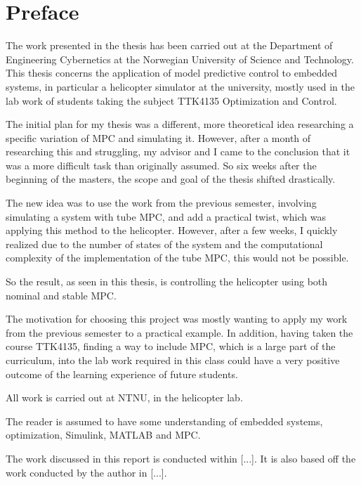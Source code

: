 \clearpage
				
\setcounter{page}{1}

\chapter*{Preface}

The work presented in the thesis has been carried out at the Department of Engineering Cybernetics at the Norwegian University of Science and Technology. This thesis concerns the application of model predictive control to embedded systems, in particular a helicopter simulator at the university, mostly used in the lab work of students taking the subject TTK4135 Optimization and Control.

The initial plan for my thesis was a different, more theoretical idea researching a specific variation of MPC and simulating it. However, after a month of researching this and struggling, my advisor and I came to the conclusion that it was a more difficult task than originally assumed. So six weeks after the beginning of the masters, the scope and goal of the thesis shifted drastically. 

The new idea was to use the work from the previous semester, involving simulating a system with tube MPC, and add a practical twist, which was applying this method to the helicopter. However, after a few weeks, I quickly realized due to the number of states of the system and the computational complexity of the implementation of the tube MPC, this would not be possible. 

So the result, as seen in this thesis, is controlling the helicopter using both nominal and stable MPC.

The motivation for choosing this project was mostly wanting to apply my work from the previous semester to a practical example. In addition, having taken the course TTK4135, finding a way to include MPC, which is a large part of the curriculum, into the lab work required in this class could have a very positive outcome of the learning experience of future students.

All work is carried out at NTNU, in the helicopter lab.

The reader is assumed  to have some understanding of embedded systems, optimization, Simulink, MATLAB and MPC.

The work discussed in this report is conducted within [...]. It is also based off the work conducted by the author in [...].

